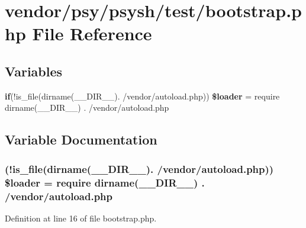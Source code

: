 \section{vendor/psy/psysh/test/bootstrap.php File Reference}
\label{psy_2psysh_2test_2bootstrap_8php}
\subsection*{Variables}
\begin{DoxyCompactItemize}
\item 
{\bf if}(!is\+\_\+file(dirname(\+\_\+\+\_\+\+D\+I\+R\+\_\+\+\_\+). \textquotesingle{}/vendor/autoload.\+php\textquotesingle{})) {\bf \$loader} = require dirname(\+\_\+\+\_\+\+D\+I\+R\+\_\+\+\_\+) . \textquotesingle{}/vendor/autoload.\+php\textquotesingle{}
\end{DoxyCompactItemize}


\subsection{Variable Documentation}
\subsubsection[{\$loader}]{ (!is\+\_\+file(dirname(\+\_\+\+\_\+\+D\+I\+R\+\_\+\+\_\+). \textquotesingle{}/vendor/autoload.\+php\textquotesingle{})) \$loader = require dirname(\+\_\+\+\_\+\+D\+I\+R\+\_\+\+\_\+) . \textquotesingle{}/vendor/autoload.\+php\textquotesingle{}}\label{psy_2psysh_2test_2bootstrap_8php_a9e5ef4a38c38e4181327caba852928fc}


Definition at line 16 of file bootstrap.\+php.

